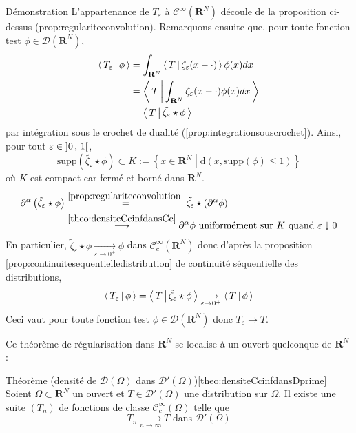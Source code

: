         \begin{demo}{Démonstration}
            L’appartenance de $T_{\varepsilon}$ à $\mathcal{C}^{\infty}(\mathbf{R}^N)$ découle de la proposition ci-dessus (prop:regulariteconvolution). Remarquons ensuite que, pour toute fonction test $\phi \in \mathcal{D}(\mathbf{R}^N)$,
            \begin{align*}
                \left< \, T_{\varepsilon} \, \middle| \, \phi \, \right> 
                &= \int_{\mathbf{R}^N} \left< \, T \, \middle| \, \zeta_{\varepsilon}(x - \cdot) \, \right> \phi(x) dx \\
                &= \left< \, T \, \middle| \, \int_{\mathbf{R}^N} \zeta_{\varepsilon}(x - \cdot) \phi(x) dx \, \right> \\
                &= \left< \, T \, \middle| \, \tilde{\zeta_{\varepsilon}} \star \phi \, \right>
            \end{align*}
            par intégration sous le crochet de dualité (\ref{prop:integrationsouscrochet}). Ainsi, pour tout $\varepsilon \in \left] 0 \, , \, 1 \right[$, 
            \[ \text{supp}(\tilde{\zeta_{\varepsilon}} \star \phi) \subset K := \left\{x \in \mathbf{R}^N \middle| \text{d}(x, \text{supp}(\phi) \leq 1)\right\} \]
            où $K$ est compact car fermé et borné dans $\mathbf{R}^N$. 
            \begin{align*}
                \partial^{\alpha} \left(\tilde{\zeta_{\varepsilon}} \star \phi\right)
                &\overset{\ref{prop:regulariteconvolution}}{=} \tilde{\zeta_{\varepsilon}} \star (\partial^{\alpha}\phi) \\
                &\overset{\ref{theo:densiteCcinfdansCc}}{\longrightarrow} \partial^{\alpha} \phi \text{ uniformément sur } K \text{ quand } \varepsilon \downarrow 0 
            \end{align*}
            En particulier, $\tilde{\zeta}_{\varepsilon} \star \phi \underset{\varepsilon \to 0^+}{\longrightarrow} \phi$ dans $\mathcal{C}_c^{\infty}(\mathbf{R}^N) $ donc d’après la proposition \ref{prop:continuitesequentielledistribution} de continuité séquentielle des distributions, 
            \[ \left< \, T_{\varepsilon} \, \middle| \, \phi \, \right> = \left< \, T \, \middle| \, \tilde{\zeta_{\varepsilon}} \star \phi \, \right> \underset{\varepsilon \to 0^+}{\longrightarrow} \left< \, T \, \middle| \, \phi \, \right> \]
            Ceci vaut pour toute fonction test $\phi \in \mathcal{D}(\mathbf{R}^N)$ donc $T_{\varepsilon} \to T$.
        \end{demo}

        Ce théorème de régularisation dans $\mathbf{R}^N$ se localise à un ouvert quelconque de $\mathbf{R}^N$ :

        \begin{omed}{Théorème (densité de $\mathcal{D}(\Omega)$ dans $\mathcal{D}'(\Omega)$)}[theo:densiteCcinfdansDprime]
            Soient $\Omega \subset \mathbf{R}^N$ un ouvert et $T \in \mathcal{D}'(\Omega)$ une distribution sur $\Omega$. Il existe une suite $(T_n)$ de fonctions de classe $\mathcal{C}_c^{\infty}(\Omega)$ telle que 
            \[ T_n \underset{n \to \infty}{\longrightarrow} T \text{ dans } \mathcal{D}'(\Omega) \]               
        \end{omed}

